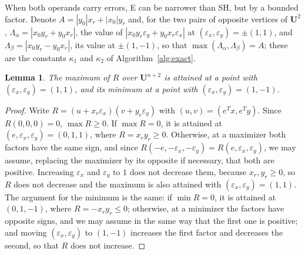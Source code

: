 \documentclass[11pt]{article}
\newtheorem{lemma}{Lemma}
\theoremstyle{definition}
\newcommand{\U}{\mathbf{U}}
\newcommand{\eps}{\varepsilon}
\newcommand{\ex}{\eps_x}
\newcommand{\ey}{\eps_y}
\begin{document}
When both operands carry errors, E can be narrower than SH, but by a bounded factor. Denote $A=|y_0|x_r+|x_0|y_r$ and, for the two pairs of opposite vertices of $\U^2$, $\Lambda_\alpha=|x_0y_r+y_0x_r|$, the value of $|x_0y_r\ey+y_0x_r\ex|$ at $(\ex,\ey)=\pm(1,1)$, and $\Lambda_\beta=|x_0y_r-y_0x_r|$, its value at $\pm(1,-1)$, so that $\max(\Lambda_\alpha,\Lambda_\beta)=A$; these are the constants $\kappa_1$ and $\kappa_2$ of Algorithm~\ref{alg:exact}.

\begin{lemma}
\label{lem:classes}
The maximum of $R$ over $\U^{n+2}$ is attained at a point with $(\ex,\ey)=(1,1)$, and its minimum at a point with $(\ex,\ey)=(1,-1)$.
\end{lemma}
\begin{proof}
Write $R=(u+x_r\ex)(v+y_r\ey)$ with $(u,v)=(e^Tx,e^Ty)$. Since $R(0,0,0)=0$, $\max R\ge0$. If $\max R=0$, it is attained at $(e,\ex,\ey)=(0,1,1)$, where $R=x_ry_r\ge0$. Otherwise, at a maximizer both factors have the same sign, and since $R(-e,-\ex,-\ey)=R(e,\ex,\ey)$, we may assume, replacing the maximizer by its opposite if necessary, that both are positive. Increasing $\ex$ and $\ey$ to $1$ does not decrease them, because $x_r,y_r\ge0$, so $R$ does not decrease and the maximum is also attained with $(\ex,\ey)=(1,1)$. The argument for the minimum is the same: if $\min R=0$, it is attained at $(0,1,-1)$, where $R=-x_ry_r\le0$; otherwise, at a minimizer the factors have opposite signs, and we may assume in the same way that the first one is positive; and moving $(\ex,\ey)$ to $(1,-1)$ increases the first factor and decreases the second, so that $R$ does not increase.
\end{proof}
\end{document}
